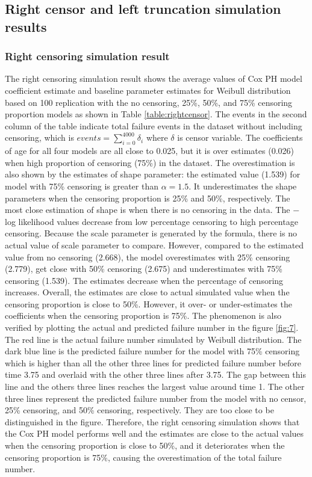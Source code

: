 \documentclass[12pt,letterpaper]{article}
\begin{document}
\subsection{Right censor and left truncation simulation results}
\subsubsection{Right censoring simulation result}
The right censoring simulation result shows the average values of Cox PH model coefficient estimate and baseline parameter estimates for Weibull distribution based on 100 replication with the no censoring, 25\%, 50\%, and 75\% censoring proportion models as shown in Table \ref{table:rightcensor}. The events in the second column of the table indicate total failure events in the dataset without including censoring, which is $events=\sum_{i=0}^{4000}{\delta_i}$ where $\delta$ is censor variable. The coefficients of age for all four models are all close to 0.025, but it is over estimates (0.026) when high proportion of censoring (75\%) in the dataset. The overestimation is also shown by the estimates of shape parameter: the estimated value (1.539) for model with 75\% censoring is greater than $\alpha=1.5$. It underestimates the shape parameters when the censoring proportion is 25\% and 50\%, respectively. The most close estimation of shape is when there is no censoring in the data. The $-$log likelihood values decrease from low percentage censoring to high percentage censoring. Because the scale parameter is generated by the formula, there is no actual value of scale parameter to compare. However, compared to the estimated value from no censoring (2.668), the model overestimates with 25\% censoring (2.779), get close with 50\% censoring (2.675) and underestimates with 75\% censoring (1.539). The estimates decrease when the percentage of censoring increases. Overall, the estimates are close to actual simulated value when the censoring proportion is close to 50\%. However, it over- or under-estimates the coefficients when the censoring proportion is 75\%. The phenomenon is also verified by plotting the actual and predicted failure number in the figure \ref{fig:7}.  The red line is the actual failure number simulated by Weibull distribution. The dark blue line is the predicted failure number for the model with 75\% censoring which is higher than all the other three lines for predicted failure number before time 3.75 and overlaid with the other three lines after 3.75. The gap between this line and the others three lines reaches the largest value around time 1. The other three lines represent the predicted failure number from the model with no censor, 25\% censoring, and 50\% censoring, respectively. They are too close to be distinguished in the figure. Therefore, the right censoring simulation shows that the Cox PH model performs well and the estimates are close to the actual values when the censoring proportion is close to 50\%, and it deteriorates when the censoring proportion is 75\%, causing the overestimation of the total failure number.
\end{document}
